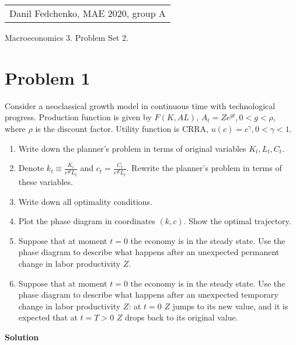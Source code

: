 \documentclass[a4paper]{article}
\begin{document}
	\begin{flushright}
	\begin{tabular}{r}
		Danil Fedchenko, MAE 2020, group A \\
	\end{tabular}
\end{flushright}


\begin{center}
	Macroeconomics 3. Problem Set 2.
\end{center}
\section*{Problem 1}
Consider a neoclassical growth model in continuous time with technological progress. Production function
is given by $F (K, AL)$, $A_t = Ze^{gt}, 0 < g < \rho$, where $\rho$ is the discount factor. Utility function is CRRA, $u (c) = c^{\gamma}, 0 < \gamma < 1$.
\begin{enumerate}[1.]
\item Write down the planner’s problem in terms of original variables $K_t, L_t, C_t$.
\item Denote $k_t \equiv \frac{K_t}{e^{gt}L_t}$ and $c_t =\frac{C_t}{e^{gt}L_t}$. Rewrite the planner’s problem in terms of these variables.
\item Write down all optimality conditions.
\item Plot the phase diagram in coordinates $(k, c)$. Show the optimal trajectory.
\item Suppose that at moment $t = 0$ the economy is in the steady state. Use the phase diagram to
describe what happens after an unexpected permanent change in labor productivity $Z$.
\item Suppose that at moment $t = 0$ the economy is in the steady state. Use the phase diagram to
describe what happens after an unexpected temporary change in labor productivity $Z$: at $t = 0$ $Z$
jumps to its new value, and it is expected that at $t = T > 0$ $Z$ drops back to its original value.
\end{enumerate}



\textbf{Solution}
\end{document}
